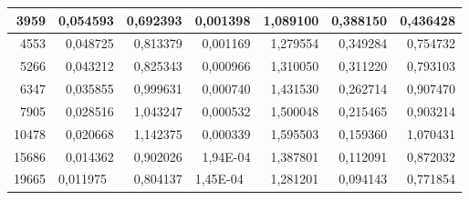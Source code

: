 \documentclass[14pt]{article}
\begin{document}
\begin{table}[H]
\begin{tabular}{|r|r|r|r|r|r|r|}
3959                    & 0,054593                         & 0,692393                  & 0,001398                      & 1,089100                  & 0,388150                    & 0,436428                    \\ \hline
4553                    & 0,048725   & 0,813379                  & 0,001169                      & 1,279554                  & 0,349284                    & 0,754732                    \\ \hline
5266                    & 0,043212                         & 0,825343                  & 0,000966                      & 1,310050                  & 0,311220                    & 0,793103                    \\ \hline
6347                    & 0,035855                         & 0,999631                  & 0,000740                      & 1,431530                  & 0,262714                    & 0,907470                    \\ \hline
7905                    & 0,028516 & 1,043247                  & 0,000532                      & 1,500048                  & 0,215465                    & 0,903214                    \\ \hline
10478                   & 0,020668 & 1,142375                  & 0,000339                      & 1,595503                  & 0,159360                    & 1,070431                    \\ \hline
15686                   & 0,014362 & 0,902026                  & 1,94E-04 & 1,387801                  & 0,112091                    & 0,872032                    \\ \hline
19665                   & \multicolumn{1}{l|}{0,011975} & 0,804137                  & \multicolumn{1}{l|}{1,45E-04} & 1,281201                  & 0,094143                    & 0,771854                    \\ \hline
\end{tabular}

\end{table}
\end{document}
